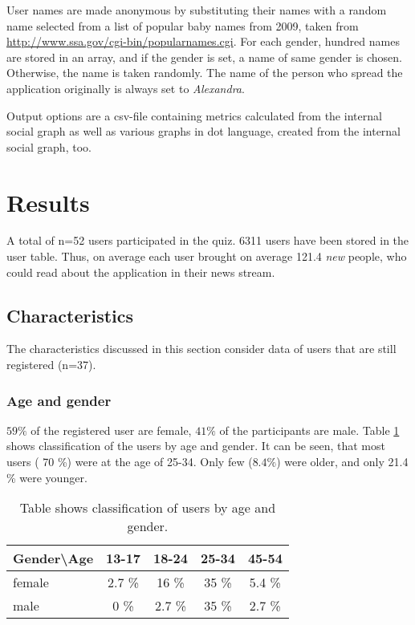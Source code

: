 \documentclass[preprint,12pt]{elsarticle}
\begin{document}
User names are made anonymous by substituting their names with a
random name selected from a list of popular baby names
from 2009, taken from \url{http://www.ssa.gov/cgi-bin/popularnames.cgi}.   
For each gender, hundred names are stored in an array, and if the
gender is set, a name of same gender is chosen. Otherwise, the name is
taken randomly. The name of the person who spread the application
originally is always set to \textit{Alexandra}.

Output options are a \ac{csv}-file containing metrics calculated from
the internal social graph as well as various graphs in dot language, created
from the internal social graph, too.





\section{Results}
\label{sec:results}
A total of n=52 users participated in the quiz. 6311 users have been
stored in the user table. Thus, on average each user brought on
average 121.4 \textit{new} people, who could read about the application
in their news stream. 

\subsection{Characteristics}
\label{sec:characteristics}

The characteristics discussed in this section consider data of users
that are still registered (n=37). 

\subsubsection{Age and gender}
\label{sec:age-gender}
$59 \%$ of the registered user are female, $41 \%$ of the participants
are male. Table \ref{tab:agegender} shows classification of the users
by age and gender. It can be seen, that most users ( 70 \%) were at
the age of 25-34. Only few ($8.4 \%$) were older, and only 21.4 \%
were younger.

\begin{center}
\begin{table}
\label{tab:agegender}
\begin{tabular}{l | c c c c}
Gender\textbackslash Age  & 13-17 & 18-24 & 25-34 & 45-54 \\
\hline
female  & 2.7 \% & 16 \% & 35 \% & 5.4 \% \\
male & 0 \% & 2.7 \% & 35 \% & 2.7 \% 
\end{tabular}
\caption{Table shows classification of users by age and gender.}
\end{table}
\end{center}
\end{document}
